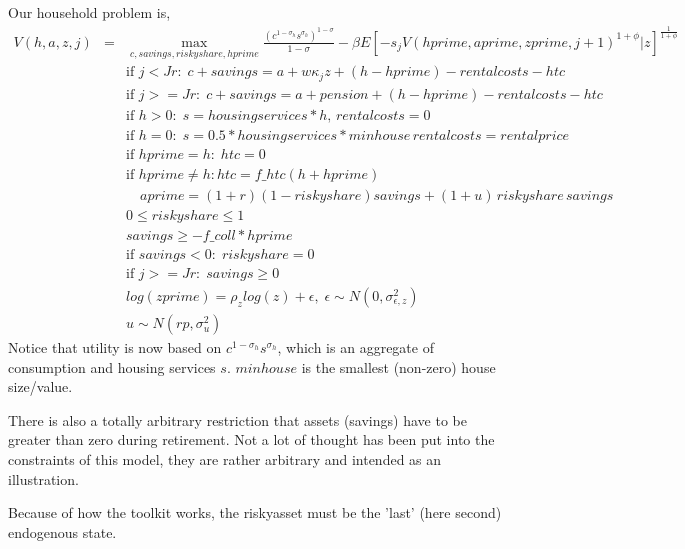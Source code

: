 Our household problem is,
\begin{eqnarray*}
 V(h,a,z,j)&=& \max_{c,savings,riskyshare,hprime} \frac{(c^{1-\sigma_h}s^{\sigma_h})^{1-\sigma}}{1-\sigma} - \beta  E[- s_j V(hprime,aprime,zprime,j+1)^{1+\phi}|z]^\frac{1}{1+\phi} \\
&& \text{if }j<Jr: \; c+savings=a+w \kappa_j z+(h-hprime)-rentalcosts-htc\\
&& \text{if }j>=Jr: \; c+savings=a +pension+(h-hprime)-rentalcosts-htc\\
&& \text{if }h>0: \; s=housingservices*h, \, rentalcosts=0 \\
&& \text{if }h=0: \; s=0.5*housingservices*minhouse \, rentalcosts=rentalprice \\
&& \text{if }hprime=h: \; htc=0 \\
&& \text{if }hprime \neq h:htc=f\_{}htc (h+hprime) \\
&& \quad aprime=(1+r) (1-riskyshare) savings + (1+u) \, riskyshare \, savings \\
&& 0\leq riskyshare \leq 1 \\
&& savings\geq -f\_{}coll * hprime \\
&& \text{if }savings<0: \; riskyshare=0 \\
&& \text{if }j>=Jr: \; savings \geq 0 \\
&& log(zprime)=\rho_z log(z) + \epsilon, \; \epsilon \sim N(0,\sigma_{\epsilon,z}^2) \\
&& u \sim N(rp,\sigma_u^2)
\end{eqnarray*}
Notice that utility is now based on $c^{1-\sigma_h}s^{\sigma_h}$, which is an aggregate of consumption and housing services $s$. $minhouse$ is the smallest (non-zero) house size/value.

There is also a totally arbitrary restriction that assets (savings) have to be greater than zero during retirement. Not a lot of thought has been put into the constraints of this model, they are rather arbitrary and intended as an illustration.

Because of how the toolkit works, the riskyasset must be the 'last' (here second) endogenous state.
